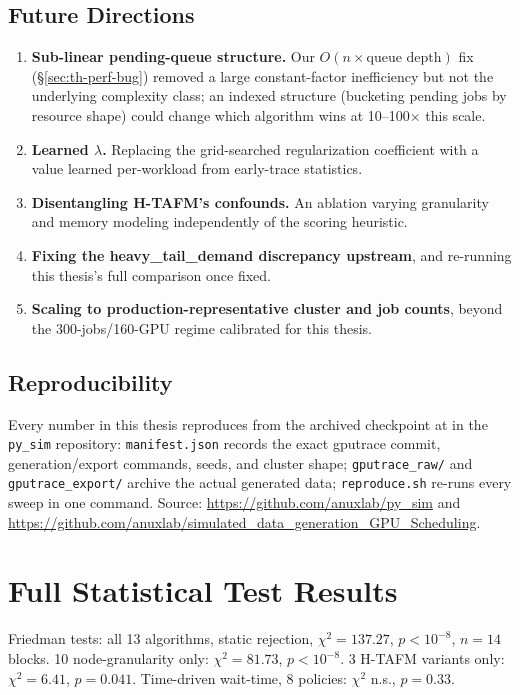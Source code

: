 \documentclass[12pt]{report}
\begin{document}
\section{Future Directions}
\begin{enumerate}[leftmargin=1.4em]
\item \textbf{Sub-linear pending-queue structure.} Our
  $O(n{\times}\text{queue depth})$ fix (\S\ref{sec:th-perf-bug}) removed a
  large constant-factor inefficiency but not the underlying complexity
  class; an indexed structure (bucketing pending jobs by resource shape)
  could change which algorithm wins at 10--100$\times$ this scale.
\item \textbf{Learned $\lambda$.} Replacing the grid-searched
  regularization coefficient with a value learned per-workload from
  early-trace statistics.
\item \textbf{Disentangling H-TAFM's confounds.} An ablation varying
  granularity and memory modeling independently of the scoring heuristic.
\item \textbf{Fixing the heavy\_tail\_demand discrepancy upstream}, and
  re-running this thesis's full comparison once fixed.
\item \textbf{Scaling to production-representative cluster and job
  counts}, beyond the 300-jobs/160-GPU regime calibrated for this thesis.
\end{enumerate}

\section*{Reproducibility}
\label{sec:th-repro}
Every number in this thesis reproduces from the archived checkpoint at
\texttt{} in
the \texttt{py\_sim} repository: \texttt{manifest.json} records the exact
gputrace commit, generation/export commands, seeds, and cluster shape;
\texttt{gputrace\_raw/} and \texttt{gputrace\_export/} archive the actual
generated data; \texttt{reproduce.sh} re-runs every sweep in one command.
Source: \url{https://github.com/anuxlab/py_sim} and
\url{https://github.com/anuxlab/simulated_data_generation_GPU_Scheduling}.




\appendix
\chapter{Full Statistical Test Results}
Friedman tests: all 13 algorithms, static rejection, $\chi^2=137.27$,
$p<10^{-8}$, $n=14$ blocks. 10 node-granularity only: $\chi^2=81.73$,
$p<10^{-8}$. 3 H-TAFM variants only: $\chi^2=6.41$, $p=0.041$. Time-driven
wait-time, 8 policies: $\chi^2$ n.s., $p=0.33$.
\end{document}
